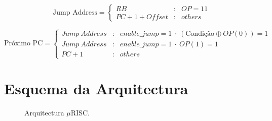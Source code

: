 \[\text{Jump Address}=\left\{
\begin{array}{rcl}
RB & : & OP=11\\
PC+1+Offset & : & others
\end{array}\right.\]

\[\text{Próximo PC}=\left\{
\begin{array}{rcl}
Jump\ Address & : & enable\_jump=1\ \cdot\ (\text{Condição} \oplus OP(0))=1\\
Jump\ Address & : & enable\_jump=1\ \cdot\ OP(1)=1\\
PC+1 & : & others
\end{array}\right.\]

\section{Esquema da Arquitectura}

\begin{figure}[H]
	\begin{center}
		\caption{Arquitectura $\mu$RISC.}
		\label{arquit}
	\end{center}
\end{figure}